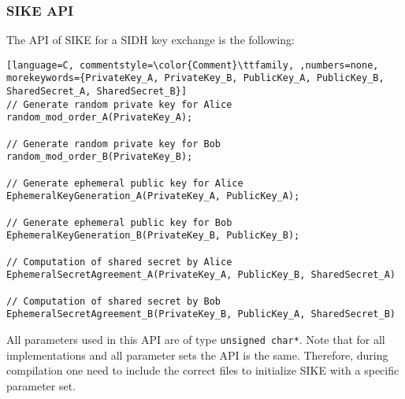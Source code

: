 \subsubsection{\gls{SIKE} API}
The API of \gls{SIKE} for a \gls{SIDH} key exchange is the following:


\begin{lstlisting}[language=C, commentstyle=\color{Comment}\ttfamily, ,numbers=none, morekeywords={PrivateKey_A, PrivateKey_B, PublicKey_A, PublicKey_B, SharedSecret_A, SharedSecret_B}]
// Generate random private key for Alice
random_mod_order_A(PrivateKey_A);

// Generate random private key for Bob
random_mod_order_B(PrivateKey_B);

// Generate ephemeral public key for Alice
EphemeralKeyGeneration_A(PrivateKey_A, PublicKey_A);

// Generate ephemeral public key for Bob
EphemeralKeyGeneration_B(PrivateKey_B, PublicKey_B);

// Computation of shared secret by Alice
EphemeralSecretAgreement_A(PrivateKey_A, PublicKey_B, SharedSecret_A)

// Computation of shared secret by Bob
EphemeralSecretAgreement_B(PrivateKey_B, PublicKey_A, SharedSecret_B)

\end{lstlisting}
All parameters used in this API are of type \texttt{unsigned char*}. Note that for all implementations and all parameter sets the API is the same. Therefore, during compilation one need to include the correct files to initialize \gls{SIKE} with a specific parameter set.

